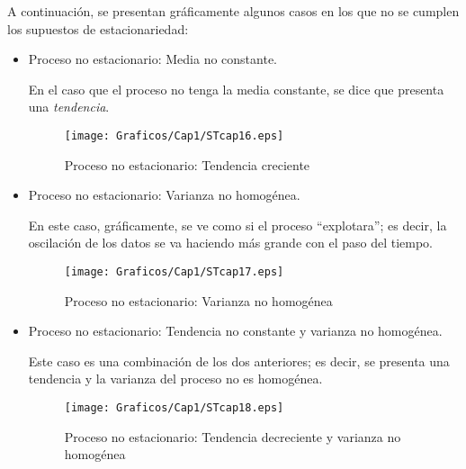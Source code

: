 A continuaci\'{o}n, se presentan gr\'{a}ficamente algunos casos en los que no se cumplen los supuestos de estacionariedad:

\begin{itemize}
\item Proceso no estacionario: Media no constante.

En el caso que el proceso no tenga la media constante, se dice que presenta una \emph{tendencia}.

\begin{figure}[H]
\centering
\texttt{[image: Graficos/Cap1/STcap16.eps]}
\caption{Proceso no estacionario: Tendencia creciente}\label{fig6}
\end{figure}

\item Proceso no estacionario: Varianza no homog\'{e}nea.

En este caso, gr\'{a}ficamente, se ve como si el proceso ``explotara''; es decir, la oscilaci\'{o}n de los datos se va haciendo m\'{a}s grande con el paso del tiempo. 

\begin{figure}[H]
\centering
\texttt{[image: Graficos/Cap1/STcap17.eps]}
\caption{Proceso no estacionario: Varianza no homog\'{e}nea}\label{fig7}
\end{figure}

\item Proceso no estacionario: Tendencia no constante y varianza no homog\'{e}nea.

Este caso es una combinaci\'{o}n de los dos anteriores; es decir, se presenta una tendencia y la varianza del proceso no es homog\'{e}nea.

\begin{figure}[H]
\centering
\texttt{[image: Graficos/Cap1/STcap18.eps]}
\caption{Proceso no estacionario: Tendencia decreciente y varianza no 
homog\'{e}nea}\label{fig8}
\end{figure}
\end{itemize}

